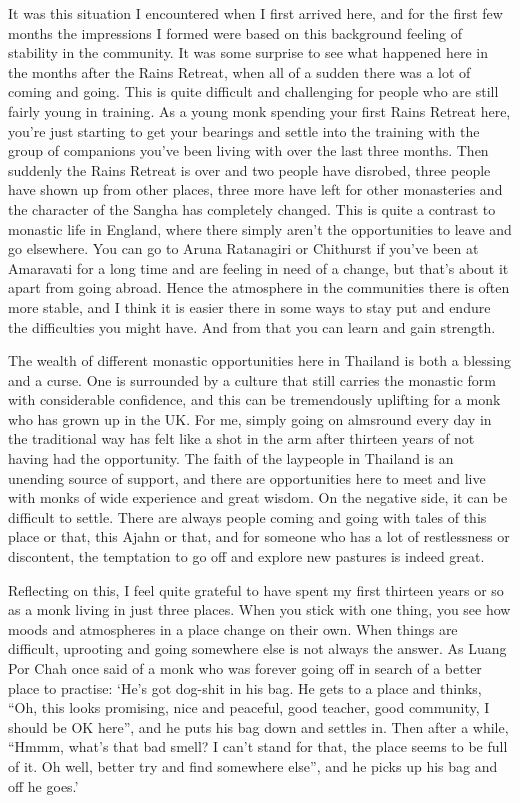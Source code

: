 It was this situation I encountered when I first arrived here, and for
the first few months the impressions I formed were based on this
background feeling of stability in the community. It was some surprise
to see what happened here in the months after the Rains Retreat, when
all of a sudden there was a lot of coming and going. This is quite
difficult and challenging for people who are still fairly young in
training. As a young monk spending your first Rains Retreat here, you're
just starting to get your bearings and settle into the training with the
group of companions you've been living with over the last three months.
Then suddenly the Rains Retreat is over and two people have disrobed,
three people have shown up from other places, three more have left for
other monasteries and the character of the Sangha has completely
changed. This is quite a contrast to monastic life in England, where
there simply aren't the opportunities to leave and go elsewhere. You can
go to Aruna Ratanagiri or Chithurst if you've been at Amaravati for a
long time and are feeling in need of a change, but that's about it apart
from going abroad. Hence the atmosphere in the communities there is
often more stable, and I think it is easier there in some ways to stay
put and endure the difficulties you might have. And from that you can
learn and gain strength.

The wealth of different monastic opportunities here in Thailand is both
a blessing and a curse. One is surrounded by a culture that still
carries the monastic form with considerable confidence, and this can be
tremendously uplifting for a monk who has grown up in the UK. For me,
simply going on almsround every day in the traditional way has felt like
a shot in the arm after thirteen years of not having had the
opportunity. The faith of the laypeople in Thailand is an unending
source of support, and there are opportunities here to meet and live
with monks of wide experience and great wisdom. On the negative side, it
can be difficult to settle. There are always people coming and going
with tales of this place or that, this Ajahn or that, and for someone
who has a lot of restlessness or discontent, the temptation to go off
and explore new pastures is indeed great.

Reflecting on this, I feel quite grateful to have spent my first
thirteen years or so as a monk living in just three places. When you
stick with one thing, you see how moods and atmospheres in a place
change on their own. When things are difficult, uprooting and going
somewhere else is not always the answer. As Luang Por Chah once said of
a monk who was forever going off in search of a better place to
practise: `He's got dog-shit in his bag. He gets to a place and thinks,
``Oh, this looks promising, nice and peaceful, good teacher, good
community, I should be OK here'', and he puts his bag down and settles
in. Then after a while, ``Hmmm, what's that bad smell? I can't stand for
that, the place seems to be full of it. Oh well, better try and find
somewhere else'', and he picks up his bag and off he goes.'

